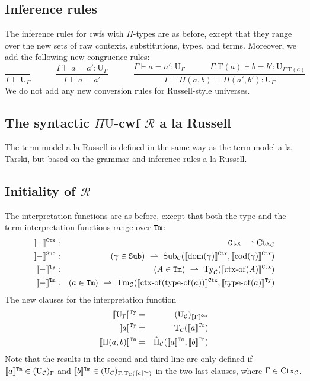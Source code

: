 \documentclass{lmcs}
\def\UU{\mathrm{U}}
\def\Ta{\mathrm{T}}
\newcommand{\intCtxU}[1]{\llbracket #1 \rrbracket^\RawCtx}
\newcommand{\intSubU}[1]{\llbracket #1 \rrbracket^\RawSub}
\newcommand{\intTyU}[1]{\llbracket #1 \rrbracket^\RawTy}
\newcommand{\intTmU}[1]{\llbracket #1 \rrbracket^\RawTm}
\begin{document}
\subsection{Inference rules}
The inference rules for cwfs with $\Pi$-types are as before, except that they range over the new sets of raw contexts, substitutions, types, and terms. Moreover, we add the following new congruence rules:
$$
\frac{}
{\Gamma \vdash \UU_\Gamma}
\hspace{3em}
\frac{\Gamma \vdash a = a' : \UU_\Gamma}
{\Gamma \vdash a = a' }
\hspace{3em}
\frac{\Gamma \vdash a = a' : \UU_\Gamma
\hspace{3em}
\Gamma.\Ta(a) \vdash b = b' : \UU_{\Gamma.\Ta(a)}}
{\Gamma \vdash \Pi(a,b) = \Pi(a',b') : \UU_\Gamma}
$$
We do not add any new conversion rules for Russell-style universes.

\def\R{\mathcal{R}}
\subsection{The syntactic $\Pi\UU$-cwf $\R$ a la Russell}
The term model a la Russell is defined in the same way as the term model a la Tarski, but based on the grammar and inference rules a la Russell.

\subsection{Initiality of $\R$}
The interpretation functions are as before, except that both the type and the term interpretation functions range over ${\tt Tm}$:
\begin{eqnarray*}
\intCtxU{-} &:& \RawCtx\ \rightharpoonup \Ctx_\C\\
\intSubU{-}&:& (\gamma \in \RawSub)\ \rightharpoonup \
\Sub_\C(\intCtxU{\domain(\gamma)}, \intCtxU{\codomain(\gamma)})\\
\intTyU{-}&:& (A \in \RawTm)\ \rightharpoonup\ \Ty_\C(\intCtxU{\ctxof(A)})\\
\intTmU{-}&:& (a \in\RawTm)\ \rightharpoonup\
\Tm_\C (\intCtxU{\ctxof(\typeof(a))}, \intTyU{\typeof(a)})
\end{eqnarray*}
The new clauses for the interpretation function
\begin{eqnarray*}
\intTyU{\UU_\Gamma} &=& (\UU_\C)_{\intCtxU{\Gamma}}\\
\intTyU{a} &=& \Ta_\C(\intTmU{a})\\
\intTmU{\Pi(a,b)}&=& \hat{\Pi}_\C(\intTmU{a},\intTmU{b})
\end{eqnarray*}
Note that the results in the second and third line are only defined if $\intTmU{a} \in (\UU_\C)_\Gamma$ and $\intTmU{b} \in (\UU_\C)_{\Gamma.\Ta_\C(\intTmU{a})}$ in the two last clauses, where $\Gamma \in \mathrm{Ctx}_{\mathcal C}$.
\end{document}
